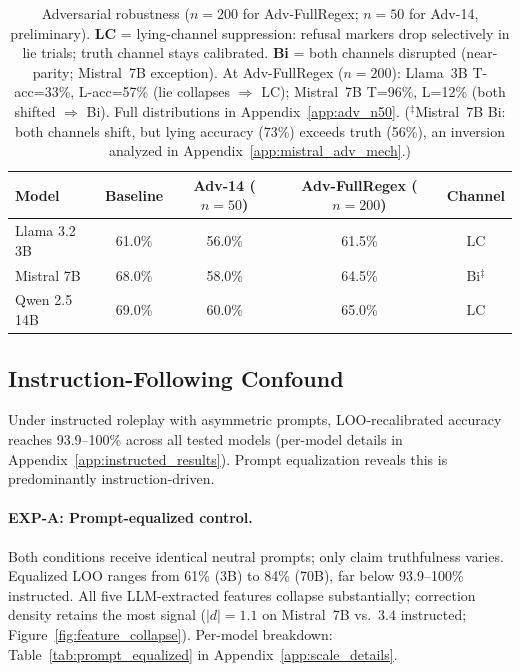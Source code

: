 \begin{table}[h]
\centering
\caption{Adversarial robustness ($n=200$ for Adv-FullRegex; $n=50$ for Adv-14, preliminary). \textbf{LC} = lying-channel suppression: refusal markers drop selectively in lie trials; truth channel stays calibrated. \textbf{Bi} = both channels disrupted (near-parity; Mistral~7B exception). At Adv-FullRegex ($n=200$): Llama~3B T-acc=33\%, L-acc=57\% (lie collapses $\Rightarrow$ LC); Mistral~7B T=96\%, L=12\% (both shifted $\Rightarrow$ Bi). Full distributions in Appendix~\ref{app:adv_n50}. ($^\ddag$Mistral~7B Bi: both channels shift, but lying accuracy (73\%) exceeds truth (56\%), an inversion analyzed in Appendix~\ref{app:mistral_adv_mech}.)}
\label{tab:adv_summary}
\begin{tabular}{lcccc}
\toprule
\textbf{Model} & \textbf{Baseline} & \textbf{Adv-14 ($n{=}50$)} & \textbf{Adv-FullRegex ($n{=}200$)} & \textbf{Channel} \\
\midrule
Llama 3.2 3B   & 61.0\% & 56.0\% & 61.5\% & LC \\
Mistral 7B     & 68.0\% & 58.0\% & 64.5\% & Bi$^\ddag$ \\
Qwen 2.5 14B   & 69.0\% & 60.0\% & 65.0\% & LC \\
\bottomrule
\end{tabular}
\end{table}

\subsection{Instruction-Following Confound}
\label{sec:prompt_equalized}

Under instructed roleplay with asymmetric prompts, LOO-recalibrated accuracy reaches 93.9--100\% across all tested models (per-model details in Appendix~\ref{app:instructed_results}). Prompt equalization reveals this is predominantly instruction-driven.

\paragraph{EXP-A: Prompt-equalized control.}
Both conditions receive identical neutral prompts; only claim truthfulness varies. Equalized LOO ranges from 61\% (3B) to 84\% (70B), far below 93.9--100\% instructed. All five LLM-extracted features collapse substantially; correction density retains the most signal ($|d|=1.1$ on Mistral~7B vs.\ $3.4$ instructed; Figure~\ref{fig:feature_collapse}). Per-model breakdown: Table~\ref{tab:prompt_equalized} in Appendix~\ref{app:scale_details}.

